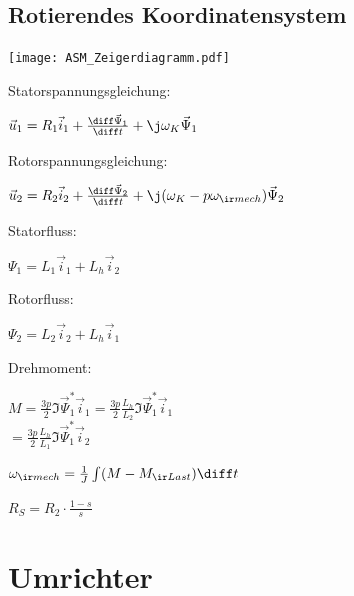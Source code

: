 \documentclass[german]{latex4ei_fs}
\begin{document}
\begin{sectionbox}
  \subsection{Rotierendes Koordinatensystem}

\texttt{[image: ASM\_Zeigerdiagramm.pdf]}


Statorspannungsgleichung:

  $\vec u_1 = R_1 \vec i_1 + \frac{\diff \vec \Psi_1}{\diff t} + \j \omega_K \vec \Psi_1$

Rotorspannungsgleichung:

  $\vec u_2 = R_2 \vec i_2 + \frac{\diff \vec \Psi_2}{\diff t} + \j (\omega_K - p \omega_{\ir mech} ) \vec \Psi_2$


Statorfluss:

  $\Psi_1 = L_1 \vec i_1 + L_h \vec i_2$

Rotorfluss:

  $\Psi_2 = L_2 \vec i_2 + L_h \vec i_1$

Drehmoment:

  $M = \frac{3 p}{2} \Im{\vec \Psi_1^* \vec i_1} = \frac{3p}{2} \frac{L_h}{L_2} \Im{\vec \Psi_1^* \vec i_1}$ \\$ =  \frac{3p}{2} \frac{L_h}{L_1} \Im{\vec \Psi_1^* \vec i_2} $

  $\omega_{\ir mech} = \frac{1}{J} \int (M - M_{\ir Last}) \diff t$

$R_S = R_2 \cdot \frac{1 -s }{s}$

 \end{sectionbox}

 \section{Umrichter}
\end{document}
